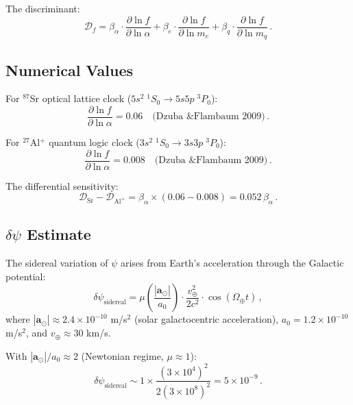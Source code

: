 \documentclass[11pt,a4paper]{article}
\begin{document}
The discriminant:
\begin{equation}
\mathcal{D}_f = \beta_\alpha \cdot \frac{\partial \ln f}{\partial \ln \alpha} + \beta_e \cdot \frac{\partial \ln f}{\partial \ln m_e} + \beta_q \cdot \frac{\partial \ln f}{\partial \ln m_q}\,.
\end{equation}

\subsection{Numerical Values}

For $^{87}$Sr optical lattice clock ($5s^2\;{}^1S_0 \to 5s5p\;{}^3P_0$):
\begin{equation}
\frac{\partial \ln f}{\partial \ln \alpha} = 0.06 \quad \text{(Dzuba \& Flambaum 2009)}\,.
\end{equation}

For $^{27}$Al$^+$ quantum logic clock ($3s^2\;{}^1S_0 \to 3s3p\;{}^3P_0$):
\begin{equation}
\frac{\partial \ln f}{\partial \ln \alpha} = 0.008 \quad \text{(Dzuba \& Flambaum 2009)}\,.
\end{equation}

The differential sensitivity:
\begin{equation}
\mathcal{D}_{\mathrm{Sr}} - \mathcal{D}_{\mathrm{Al}^+} = \beta_\alpha \times (0.06 - 0.008) = 0.052\,\beta_\alpha\,.
\end{equation}

\subsection{$\delta\psi$ Estimate}

The sidereal variation of $\psi$ arises from Earth's acceleration through the Galactic potential:
\begin{equation}
\delta\psi_{\mathrm{sidereal}} = \mu\left(\frac{|\mathbf{a}_\odot|}{a_0}\right) \cdot \frac{v_\oplus^2}{2c^2} \cdot \cos(\Omega_\oplus t)\,,
\end{equation}
where $|\mathbf{a}_\odot| \approx 2.4 \times 10^{-10}$ m/s$^2$ (solar galactocentric acceleration), $a_0 = 1.2 \times 10^{-10}$ m/s$^2$, and $v_\oplus \approx 30$ km/s.

With $|\mathbf{a}_\odot|/a_0 \approx 2$ (Newtonian regime, $\mu \approx 1$):
\begin{equation}
\delta\psi_{\mathrm{sidereal}} \sim 1 \times \frac{(3 \times 10^4)^2}{2(3 \times 10^8)^2} = 5 \times 10^{-9}\,.
\end{equation}
\end{document}
